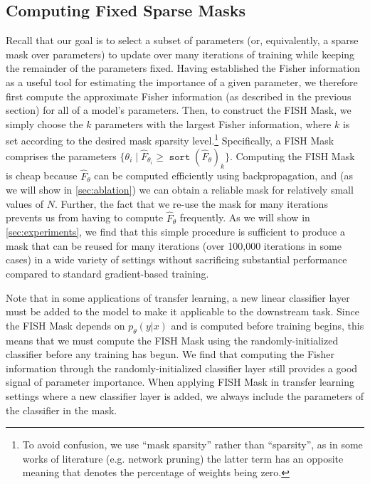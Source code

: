 \subsection{Computing Fixed Sparse Masks} \label{ssub:compute_sparse_mask}

Recall that our goal is to select a subset of parameters (or, equivalently, a sparse mask over parameters) to update over many iterations of training while keeping the remainder of the parameters fixed. Having established the Fisher information as a useful tool for estimating the importance of a given parameter, we therefore first compute the approximate Fisher information (as described in the previous section) for all of a model's parameters. Then, to construct the FISH Mask, we simply choose the $k$ parameters with the largest Fisher information, where $k$ is set according to the desired mask sparsity level.\footnote{To avoid confusion, we use ``mask sparsity'' rather than ``sparsity'', as in some works of literature (e.g. network pruning) the latter term has an opposite meaning that denotes the percentage of weights being zero.} Specifically, a FISH Mask comprises the parameters $\{\theta_i \mid \hat{F}_{\theta_i} \ge \mathop{\texttt{sort}}(\hat{F}_\theta)_k\}$.
Computing the FISH Mask is cheap because $\hat{F}_\theta$ can be computed efficiently using backpropagation, and (as we will show in \ref{sec:ablation}) we can obtain a reliable mask for relatively small values of $N$. Further, the fact that we re-use the mask for many iterations prevents us from having to compute $\hat{F}_\theta$ frequently. As we will show in \ref{sec:experiments}, we find that this simple procedure is sufficient to produce a mask that can be reused for many iterations (over 100,000 iterations in some cases) in a wide variety of settings without sacrificing substantial performance compared to standard gradient-based training.

Note that in some applications of transfer learning, a new linear classifier layer must be added to the model to make it applicable to the downstream task. Since the FISH Mask depends on $p_\theta(y | x)$ and is computed before training begins, this means that we must compute the FISH Mask using the randomly-initialized classifier before any training has begun. We find that computing the Fisher information through the randomly-initialized classifier layer  still provides a good signal of parameter importance. When applying FISH Mask in transfer learning settings where a new classifier layer is added, we always include the parameters of the classifier in the mask.


